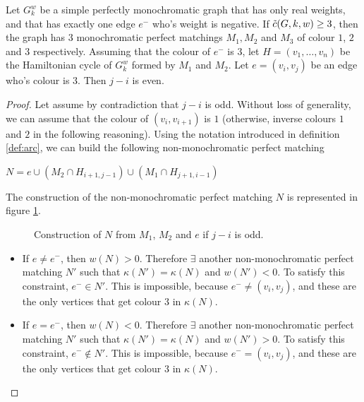 \begin{observation}
    \label{obs:one_neg_edge_parity_crossing_edges}
    Let $G_k^w$ be a simple perfectly monochromatic graph that has only real weights, and that has exactly one edge $e^-$ who's weight is negative. If $\Tilde{c}(G, k, w) \geq 3$, then the graph has $3$ monochromatic perfect matchings $M_1, M_2$ and $M_3$ of colour $1$, $2$ and $3$ respectively. Assuming that the colour of $e^-$ is $3$, let $H = (v_1, \dots, v_n)$ be the Hamiltonian cycle of $G_k^w$ formed by $M_1$ and $M_2$. Let $e = (v_i, v_j)$ be an edge who's colour is $3$. Then $j-i$ is even.
\end{observation}

\begin{proof}
    Let assume by contradiction that $j-i$ is odd. Without loss of generality, we can assume that the colour of $(v_i, v_{i+1})$ is $1$ (otherwise, inverse colours $1$ and $2$ in the following reasoning). Using the notation introduced in definition \ref{def:arc}, we can build the following non-monochromatic perfect matching

    \begin{center}
        $N = e \cup (M_2 \cap H_{i+1, j-1}) \cup (M_1 \cap H_{j+1, i-1})$
    \end{center}

    The construction of the non-monochromatic perfect matching $N$ is represented in figure \ref{fig:unique_neg_odd_crossings}.

    \begin{figure}[H]
        \caption{Construction of $N$ from $M_1$, $M_2$ and $e$ if $j-i$ is odd.}
        \label{fig:unique_neg_odd_crossings}
    \end{figure}

    \begin{itemize}
        \item If $e \neq e^-$, then $w(N) > 0$. Therefore $\exists$ another non-monochromatic perfect matching $N'$ such that $\kappa(N') = \kappa(N)$ and $w(N') < 0$. To satisfy this constraint, $e^- \in N'$. This is impossible, because $e^- \neq (v_i, v_j)$, and these are the only vertices that get colour $3$ in $\kappa(N)$.

        \item If $e = e^-$, then $w(N) < 0$. Therefore $\exists$ another non-monochromatic perfect matching $N'$ such that $\kappa(N') = \kappa(N)$ and $w(N') > 0$. To satisfy this constraint, $e^- \notin N'$. This is impossible, because $e^- = (v_i, v_j)$, and these are the only vertices that get colour $3$ in $\kappa(N)$.
    \end{itemize}
\end{proof}

